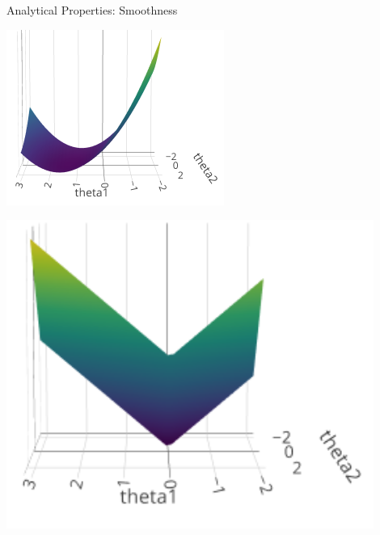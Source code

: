 \begin{vbframe}{Analytical Properties: Smoothness}
\begin{minipage}[c]{0.3\textwidth}
  \includegraphics[width=\textwidth]{figure/lasso_unpenalized}
\end{minipage}%
\begin{minipage}[c]{0.05\textwidth}
  \phantom{foo}
\end{minipage}%
\begin{minipage}[c]{0.3\textwidth}
  \includegraphics[width=0.9\textwidth]{figure/lasso_penalty}
\end{minipage}%
\begin{minipage}[c]{0.05\textwidth}
  \phantom{foo}
\end{minipage}%

\end{vbframe}
